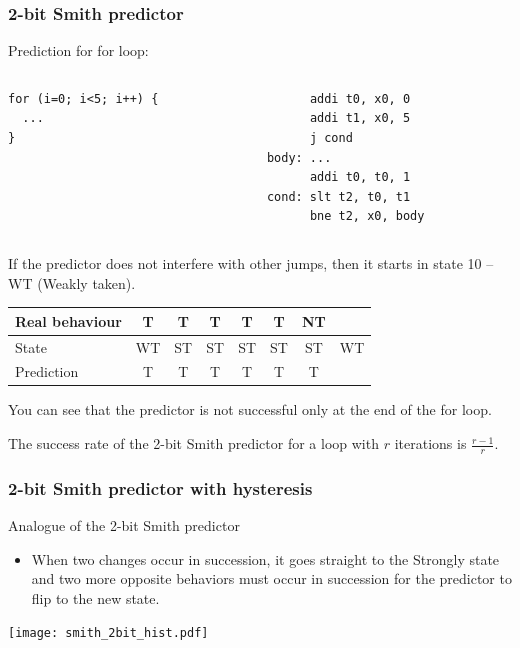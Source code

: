 \documentclass{beamer}
\begin{document}
\begin{frame}[fragile]
\frametitle{2-bit Smith predictor}

Prediction for for loop:

\begin{columns}[T]
\begin{column}{0.35\textwidth}
\begin{verbatim}
for (i=0; i<5; i++) {
  ...
}
\end{verbatim}
\end{column}
\hfill
\begin{column}{0.45\textwidth}
\begin{verbatim}
      addi t0, x0, 0
      addi t1, x0, 5
      j cond
body: ...
      addi t0, t0, 1
cond: slt t2, t0, t1
      bne t2, x0, body
\end{verbatim}
\end{column}
\end{columns}
\bigskip
\small
If the predictor does not interfere with other jumps, then it starts in state 10 -- WT (Weakly taken).

\begin{tabular}{|l|c|c|c|c|c|c|c|}\hline
Real behaviour & T & T & T & T & T & NT & \\ \hline
State & WT & ST & ST & ST & ST & ST & WT\\ \hline
Prediction & T & T & T & T & T & {\color{red}T} &\\\hline
\end{tabular}

You can see that the predictor is not successful only at the end of the for loop.

The success rate of the 2-bit Smith predictor for a loop with $r$ iterations is $\frac{r-1}{r}$.
\end{frame}


\begin{frame}
\frametitle{2-bit Smith predictor with hysteresis}

Analogue of the 2-bit Smith predictor
\begin{itemize}
\item When two changes occur in succession, it goes straight to the Strongly state and two more opposite behaviors must occur in succession for the predictor to flip to the new state.
\end{itemize}

\begin{center}
\texttt{[image: smith\_2bit\_hist.pdf]}
\end{center}
\end{frame}
\end{document}
